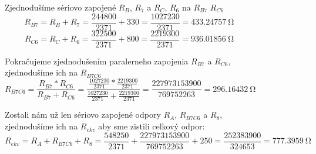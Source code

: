 \begin{figure}[!ht]
\begin{center}
    
    Zjednodušíme sériovo zapojené $R_B$, $R_7$ a $R_C$, $R_6$ na $R_{B7}$  $R_{C6}$
    \[
        R_{B7} = R_B + R_7 = \frac{244800}{2371} + 330 = \frac{1027230}{2371} = \SI{433,24757}{\ohm}
    \]
    \[
        R_{C6} = R_C + R_6 = \frac{322500}{2371} + 800 = \frac{2219300}{2371} = \SI{936,01856}{\ohm}
    \]
    \newline
    
    Pokračujeme zjednodušením paralerneho zapojenia $R_{B7}$ a $R_{C6}$, zjednodušíme ich na $R_{B7C6}$
    \[
        R_{B7C6} = \frac{R_{B7} * R_{C6}}{R_{B7} + R_{C6}} = 
        \frac{\frac{1027230}{2371} * \frac{2219300}{2371}}{\frac{1027230}{2371} + \frac{2219300}{2371}} = 
        \frac{227973153900}{769752263} = \SI{296,16432}{\ohm}
    \]
    
    Zostali nám už len sériovo zapojené odpory $R_A$, $R_{B7C6}$ a $R_8$, zjednodušíme ich na $R_{ekv}$ aby sme zistili celkový odpor:
    \[
        R_{ekv} = R_A + R_{B7C6} + R_8 = \frac{548250}{2371} + \frac{227973153900}{769752263} + 250 = 
        \frac{252383900}{324653} = \SI{777,3959}{\ohm}
    \]
\end{center}
\end{figure}
